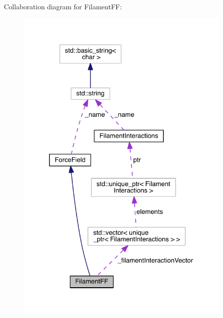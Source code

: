 Collaboration diagram for Filament\+F\+F\+:\nopagebreak
\begin{figure}[H]
\begin{center}
\leavevmode
\includegraphics[width=300pt]{classFilamentFF__coll__graph}
\end{center}
\end{figure}
